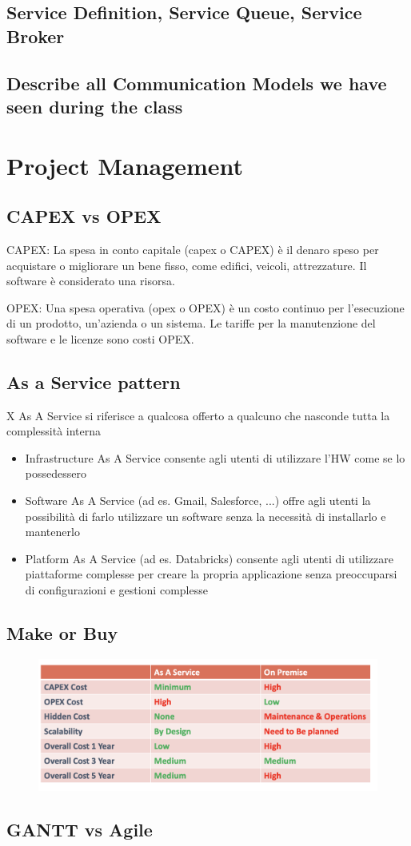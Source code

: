 \documentclass{article}
\begin{document}
\subsection{Service Definition, Service Queue, Service Broker}
\subsection{Describe all Communication Models we have seen during the class}
\section{Project Management}
\subsection{CAPEX vs OPEX}
CAPEX: La spesa in conto capitale (capex o CAPEX) è il denaro speso per acquistare o migliorare un bene fisso, come edifici, veicoli, attrezzature. Il software è considerato una risorsa.

OPEX: Una spesa operativa (opex o OPEX) è un costo continuo per l'esecuzione di un prodotto, un'azienda o un sistema. Le tariffe per la manutenzione del software e le licenze sono costi OPEX.
\subsection{As a Service pattern}
X As A Service si riferisce a qualcosa offerto a qualcuno che nasconde tutta la complessità interna
\begin{itemize}
    \item Infrastructure As A Service consente agli utenti di utilizzare l'HW come se lo possedessero
    \item Software As A Service (ad es. Gmail, Salesforce, ...) offre agli utenti la possibilità di farlo
utilizzare un software senza la necessità di installarlo e mantenerlo
    \item Platform As A Service (ad es. Databricks) consente agli utenti di utilizzare piattaforme complesse per creare la propria applicazione senza preoccuparsi di configurazioni e gestioni complesse
\end{itemize}
\subsection{Make or Buy}

\begin{figure}[htp]
    \centering
    \includegraphics[width=\linewidth]{fig/make_or_buy.png}
    \label{fig:Make Or Buy}
\end{figure}

\subsection{GANTT vs Agile}
\end{document}
